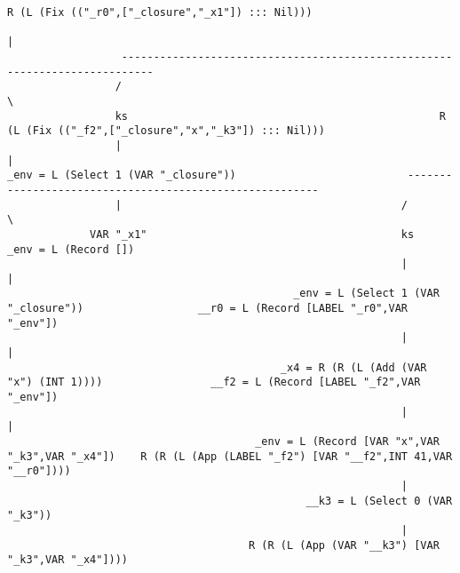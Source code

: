 \begin{landscape}
\begin{lstlisting}[basicstyle=\fontsize{9}{10}\selectfont\ttfamily]
                                                   R (L (Fix (("_r0",["_closure","_x1"]) ::: Nil)))
                                                                          |
                  ---------------------------------------------------------------------------
                 /                                                                           \
                 ks                                                 R (L (Fix (("_f2",["_closure","x","_k3"]) ::: Nil)))
                 |                                                                           |
_env = L (Select 1 (VAR "_closure"))                           --------------------------------------------------------
                 |                                            /                                                        \
             VAR "_x1"                                        ks                                              _env = L (Record [])
                                                              |                                                        |
                                             _env = L (Select 1 (VAR "_closure"))                  __r0 = L (Record [LABEL "_r0",VAR "_env"])
                                                              |                                                        |
                                           _x4 = R (R (L (Add (VAR "x") (INT 1))))                 __f2 = L (Record [LABEL "_f2",VAR "_env"])
                                                              |                                                        |
                                       _env = L (Record [VAR "x",VAR "_k3",VAR "_x4"])    R (R (L (App (LABEL "_f2") [VAR "__f2",INT 41,VAR "__r0"])))
                                                              |
                                               __k3 = L (Select 0 (VAR "_k3"))
                                                              |
                                      R (R (L (App (VAR "__k3") [VAR "_k3",VAR "_x4"])))

\end{lstlisting}
\end{landscape}
\clearpage

